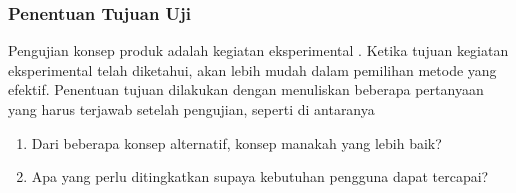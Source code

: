 \subsubsection{Penentuan Tujuan Uji} \label{sub-subBab:penentuan-tujuan-uji}
Pengujian konsep produk adalah kegiatan eksperimental \cite{bukuUlrich}. Ketika tujuan kegiatan eksperimental telah diketahui, akan lebih mudah dalam pemilihan metode yang efektif. Penentuan tujuan dilakukan dengan menuliskan beberapa pertanyaan yang harus terjawab setelah pengujian, seperti di antaranya
\begin{enumerate}
    \item Dari beberapa konsep alternatif, konsep manakah yang lebih baik?
    \item Apa yang perlu ditingkatkan supaya kebutuhan pengguna dapat tercapai?
\end{enumerate} 
